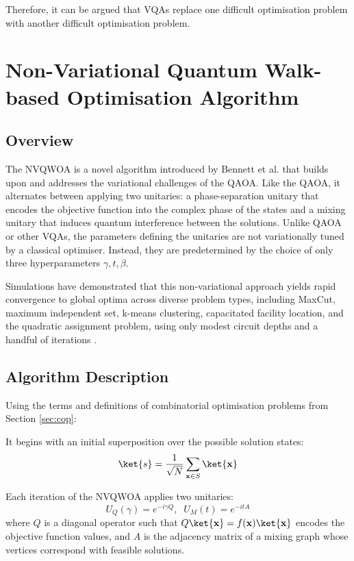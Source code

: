 Therefore, it can be argued that VQAs replace one difficult optimisation problem with another difficult optimisation problem.

\section{Non-Variational Quantum Walk-based Optimisation Algorithm}
\subsection{Overview}
The NVQWOA is a novel algorithm introduced by Bennett et al. that builds upon and addresses the variational challenges of the QAOA\cite{bennett2024nonvariational,bennett2024analysisnonvariationalquantumwalkbased}. 
Like the QAOA, it alternates between applying two unitaries: a phase-separation unitary that encodes the objective function into the complex phase of the states and a mixing unitary that induces quantum interference between the solutions. Unlike QAOA or other VQAs, the parameters defining the unitaries are not variationally tuned by a classical optimiser. Instead, they are predetermined by the choice of only three hyperparameters $\gamma, t, \beta$.

Simulations have demonstrated that this non-variational approach yields rapid convergence to global optima across diverse problem types, including MaxCut, maximum independent set, k-means clustering, capacitated facility location, and the quadratic assignment problem, using only modest circuit depths and a handful of iterations \cite{bennett2024analysisnonvariationalquantumwalkbased}.

\subsection{Algorithm Description}
Using the terms and definitions of combinatorial optimisation problems from Section \ref{sec:cop}:

It begins with an initial superposition over the possible solution states:
$$\ket{s}=\frac{1}{\sqrt{N}}\sum_{\mathbf{x}\in S}\ket{\mathbf{x}}$$

Each iteration of the NVQWOA applies two unitaries:
$$U_Q(\gamma)=e^{-i\gamma Q},\;\;U_M(t)=e^{-itA}$$
where $Q$ is a diagonal operator such that $Q\ket{\mathbf{x}}=f(\mathbf{x})\ket{\mathbf{x}}$ encodes the objective function values, and $A$ is the adjacency matrix of a mixing graph whose vertices correspond with feasible solutions.

